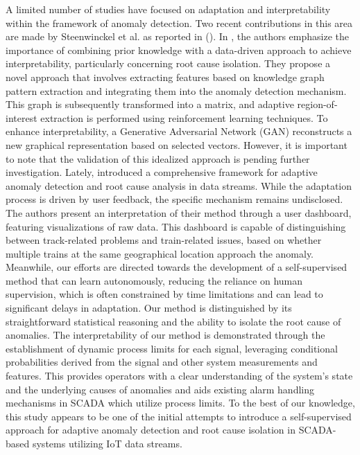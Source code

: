 A limited number of studies have focused on adaptation and interpretability within the framework of anomaly detection. Two recent contributions in this area are made by Steenwinckel et al. as reported in (\cite{Steenwinckel2018, Steenwinckel2021}). In \cite{Steenwinckel2018}, the authors emphasize the importance of combining prior knowledge with a data-driven approach to achieve interpretability, particularly concerning root cause isolation. They propose a novel approach that involves extracting features based on knowledge graph pattern extraction and integrating them into the anomaly detection mechanism. This graph is subsequently transformed into a matrix, and adaptive region-of-interest extraction is performed using reinforcement learning techniques. To enhance interpretability, a Generative Adversarial Network (GAN) reconstructs a new graphical representation based on selected vectors. However, it is important to note that the validation of this idealized approach is pending further investigation. Lately, \cite{Steenwinckel2021} introduced a comprehensive framework for adaptive anomaly detection and root cause analysis in data streams. While the adaptation process is driven by user feedback, the specific mechanism remains undisclosed. The authors present an interpretation of their method through a user dashboard, featuring visualizations of raw data. This dashboard is capable of distinguishing between track-related problems and train-related issues, based on whether multiple trains at the same geographical location approach the anomaly. Meanwhile, our efforts are directed towards the development of a self-supervised method that can learn autonomously, reducing the reliance on human supervision, which is often constrained by time limitations and can lead to significant delays in adaptation. Our method is distinguished by its straightforward statistical reasoning and the ability to isolate the root cause of anomalies. The interpretability of our method is demonstrated through the establishment of dynamic process limits for each signal, leveraging conditional probabilities derived from the signal and other system measurements and features. This provides operators with a clear understanding of the system's state and the underlying causes of anomalies and aids existing alarm handling mechanisms in SCADA which utilize process limits.
To the best of our knowledge, this study appears to be one of the initial attempts to introduce a self-supervised approach for adaptive anomaly detection and root cause isolation in SCADA-based systems utilizing IoT data streams.

